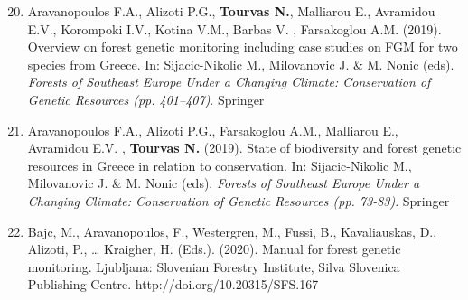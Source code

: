 \documentclass[12pt,]{scrartcl}
\begin{document}
\begin{enumerate}
\setcounter{enumi}{19}
\leftskip-0.07in
\vspace{-3mm}

\item Aravanopoulos F.A., Alizoti P.G., \textbf{Tourvas N.}, Malliarou E., Avramidou E.V., Korompoki I.V., Kotina V.M., Barbas V. ,  Farsakoglou A.M. (2019). Overview on forest genetic monitoring including case studies on FGM for two species from Greece. In: Sijacic-Nikolic M., Milovanovic J. \& M. Nonic (eds). \textit{Forests of Southeast Europe Under a Changing Climate: Conservation of Genetic Resources (pp. 401–407)}. Springer


\item Aravanopoulos F.A., Alizoti P.G., Farsakoglou A.M., Malliarou E., Avramidou E.V. , \textbf{Tourvas N.}  (2019). State of biodiversity and forest genetic resources in Greece in relation to conservation. In: Sijacic-Nikolic M., Milovanovic J. \& M. Nonic (eds). \textit{Forests of Southeast Europe Under a Changing Climate: Conservation of Genetic Resources (pp. 73-83)}. Springer

\item Bajc, M., Aravanopoulos, F., Westergren, M., Fussi, B., Kavaliauskas, D., Alizoti, P., … Kraigher, H. (Eds.). (2020). Manual for forest genetic monitoring. Ljubljana: Slovenian Forestry Institute, Silva Slovenica Publishing Centre. http://doi.org/10.20315/SFS.167
\end{enumerate}




\end{document}
